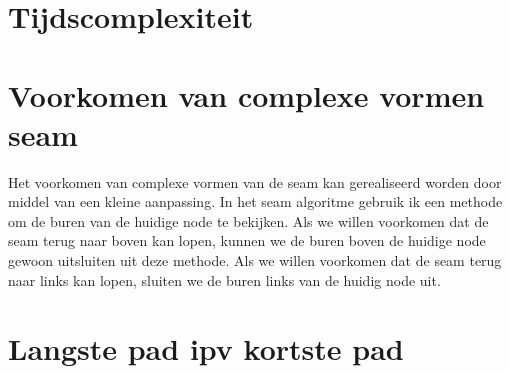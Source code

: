 \documentclass[11pt, a4paper]{article}
\begin{document}
\section*{Tijdscomplexiteit}
\section*{Voorkomen van complexe vormen seam}
Het voorkomen van complexe vormen van de seam kan gerealiseerd worden door middel van een kleine aanpassing. In het seam algoritme gebruik ik een methode om de buren van de huidige node te bekijken. Als we willen voorkomen dat de seam terug naar boven kan lopen, kunnen we de buren boven de huidige node gewoon uitsluiten uit deze methode. Als we willen voorkomen dat de seam terug naar links kan lopen, sluiten we de buren links van de huidig node uit.
\section*{Langste pad ipv kortste pad}


\newpage
\end{document}
